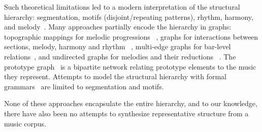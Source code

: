 Such theoretical limitations led to a modern interpretation of the structural hierarchy: segmentation, motifs (disjoint/repeating patterns), rhythm, harmony, and melody~\cite{msaf,milne,dai2024}. Many approaches partially encode the hierarchy in graphs: topographic mappings for melodic progressions ~\cite{mokbel2009_graph}, graphs for interactions between sections, melody, harmony and rhythm ~\cite{cmu_dannenberg_2020}, multi-edge graphs for bar-level relations~\cite{music_structure_lit_review}, and undirected graphs for melodies and their reductions ~\cite{orio2009}. The prototype graph~\cite{young_2022} is a bipartite network relating prototype elements to the music they represent. Attempts to model the structural hierarchy with formal grammars~\cite{smallest_grammar,repetition_grammars_ismir2023} are limited to segmentation and motifs.

None of these approaches encapsulate the entire hierarchy, and to our knowledge, there have also been no attempts to synthesize representative structure from a music corpus.